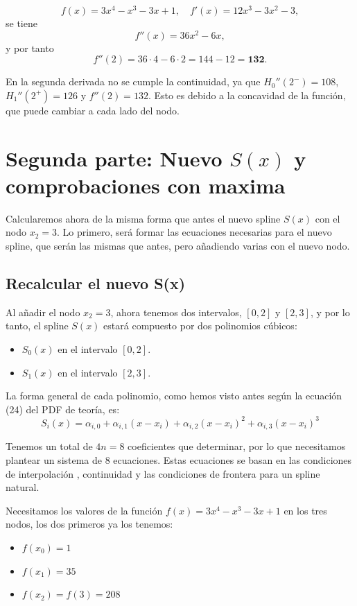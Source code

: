 \documentclass{article}
\begin{document}
\[
f(x) = 3x^4 - x^3 - 3x + 1,
\quad
f'(x) = 12x^3 - 3x^2 - 3,
\]
se tiene
\[
f''(x) = 36x^2 - 6x,
\]
y por tanto
\[
f''(2) = 36\cdot4 - 6\cdot2 = 144 - 12 = \mathbf{132}.
\]

En la segunda derivada no se cumple la continuidad, ya que \(H_0''(2^-) = 108\), \(H_1''(2^+) = 126\) y \(f''(2) = 132\). Esto es debido a la concavidad de la función, que puede cambiar a cada lado del nodo.


\section{Segunda parte: Nuevo $S(x)$ y comprobaciones con maxima }


Calcularemos ahora de la misma forma que antes el nuevo spline \(S(x)\) con el nodo \(x_2=3\). Lo primero, será formar las ecuaciones necesarias para el nuevo spline, que serán las mismas que antes, pero añadiendo varias con el nuevo nodo.

\subsection{Recalcular el nuevo S(x)}

Al añadir el nodo $x_2=3$, ahora tenemos dos intervalos, $[0, 2]$ y $[2, 3]$, y por lo tanto, el spline $S(x)$ estará compuesto por dos polinomios cúbicos:
\begin{itemize}
    \item $S_0(x)$ en el intervalo $[0, 2]$.
    \item $S_1(x)$ en el intervalo $[2, 3]$.
\end{itemize}

La forma general de cada polinomio, como hemos visto antes según la ecuación (24) del PDF de teoría, es:
$$S_i(x) = \alpha_{i,0} + \alpha_{i,1}(x-x_i) + \alpha_{i,2}(x-x_i)^2 + \alpha_{i,3}(x-x_i)^3$$

Tenemos un total de $4n=8$ coeficientes que determinar, por lo que necesitamos plantear un sistema de 8 ecuaciones. Estas ecuaciones se basan en las condiciones de interpolación , continuidad  y las condiciones de frontera para un spline natural.


Necesitamos los valores de la función $f(x) = 3x^4 - x^3 - 3x + 1$ en los tres nodos, los dos primeros ya los tenemos:
\begin{itemize}
    \item $f(x_0) = 1$
    \item $f(x_1) = 35$
    \item $f(x_2) = f(3) = 208$
\end{itemize}
\end{document}
